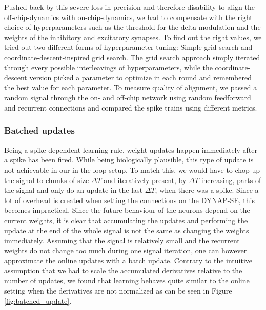 \documentclass[twoside,11pt]{article}
\begin{document}
Pushed back by this severe loss in precision and therefore disability to align the off-chip-dynamics with 
on-chip-dynamics, we had to compensate with the right choice of hyperparameters such as the threshold
for the delta modulation and the weights of the inhibitory and excitatory synapses.
To find out the right values, we tried out two different forms of hyperparameter tuning: Simple grid
search and coordinate-descent-inspired grid search. The grid search approach simply iterated through every
possible interleavings of hyperparameters, while the coordinate-descent version picked a parameter to optimize
in each round and remembered the best value for each parameter.
To measure quality of alignment, we passed a random signal through the on- and off-chip network using random
feedforward and recurrent connections and compared the spike trains using different metrics.




\subsubsection{Batched updates}

Being a spike-dependent learning rule, weight-updates happen immediately after a spike has been fired.
While being biologically plausible, this type of update is not achievable in our in-the-loop setup.
To match this, we would have to chop up the signal to chunks of size $\Delta T$ and iteratively present,
by $\Delta T$ increasing, parts of the signal and only do an update in the last $\Delta T$, when there 
was a spike. Since a lot of overhead is created when setting the connections on the DYNAP-SE, this becomes
impractical.
Since the future behaviour of the neurons depend on the current weights, it is clear that accumulating the
updates and performing the update at the end of the whole signal is not the same as changing the weights
immediately. Assuming that the signal is relatively small and the recurrent weights do not change too
much during one signal iteration, one can however approximate the online updates with a batch update.
Contrary to the intuitive assumption that we had to scale the accumulated derivatives relative to the
number of updates, we found that learning behaves quite similar to the online setting when the
derivatives are not normalized as can be seen in Figure \ref{fig:batched_update}.
\end{document}
